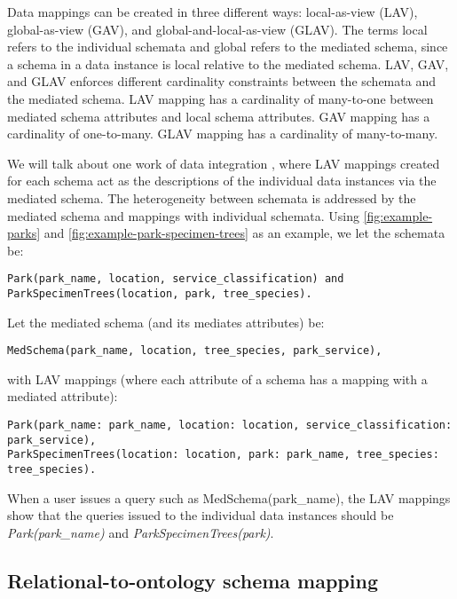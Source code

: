 Data mappings can be created in three different ways: local-as-view (LAV), global-as-view (GAV), and global-and-local-as-view (GLAV). The terms local refers to the individual schemata and global refers to the mediated schema, since a schema in a data instance is local relative to the mediated schema. LAV, GAV, and GLAV enforces different cardinality constraints between the schemata and the mediated schema. LAV mapping has a cardinality of many-to-one between mediated schema attributes and local schema attributes. GAV mapping has a cardinality of one-to-many. GLAV mapping has a cardinality of many-to-many.

We will talk about one work of data integration \cite{Levy1996Querying}, where LAV mappings created for each schema act as the descriptions of the individual data instances via the mediated schema. The heterogeneity between schemata is addressed by the mediated schema and mappings with individual schemata. Using \autoref{fig:example-parks} and \autoref{fig:example-park-specimen-trees} as an example, we let the schemata be:

\begin{lstlisting}
Park(park_name, location, service_classification) and
ParkSpecimenTrees(location, park, tree_species).
\end{lstlisting}

Let the mediated schema (and its mediates attributes) be:

\begin{lstlisting}
MedSchema(park_name, location, tree_species, park_service),
\end{lstlisting}

with LAV mappings (where each attribute of a schema has a mapping with a mediated attribute):
\begin{lstlisting}
Park(park_name: park_name, location: location, service_classification: park_service),
ParkSpecimenTrees(location: location, park: park_name, tree_species: tree_species).
\end{lstlisting}

When a user issues a query such as MedSchema(park\_name), the LAV mappings show that the queries issued to the individual data instances should be \textit{Park(park\_name)} and \textit{ParkSpecimenTrees(park)}.

\subsection{Relational-to-ontology schema mapping}

